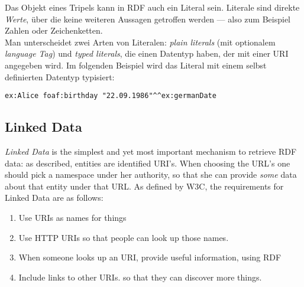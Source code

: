 Das Objekt eines Tripels kann in RDF auch ein Literal sein. Literale sind direkte \emph{Werte}, über die keine weiteren Aussagen getroffen werden --- also zum Beispiel Zahlen oder Zeichenketten.\\ 
Man unterscheidet zwei Arten von Literalen:
\textit{plain literals} (mit optionalem \textit{language Tag}) und \textit{typed literals}, die einen Datentyp haben, der mit einer URI angegeben wird. Im folgenden Beispiel wird das Literal mit einem selbst definierten Datentyp typisiert:

\vspace{0.2ex}

\begin{lstlisting}[style=N3]
ex:Alice foaf:birthday "22.09.1986"^^ex:germanDate
\end{lstlisting}

\subsection{Linked Data}
\textit{Linked Data} is the simplest and yet most important mechanism to retrieve RDF data: as described, entities are identified URI's. When choosing the URL's one should pick a namespace under her authority, so that she can provide \textit{some} data about that entity under that URL. As defined by W3C, the requirements for Linked Data are as follows:

\begin{enumerate}
\item Use URIs as names for things
\item Use HTTP URIs so that people can look up those names.
\item When someone looks up an URI, provide useful information, using RDF
\item Include links to other URIs. so that they can discover more things.
\end{enumerate}
 
